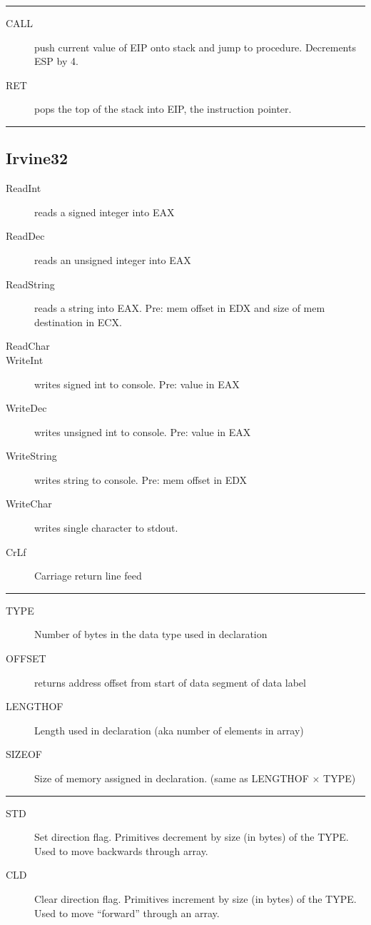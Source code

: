 \documentclass[10pt,landscape]{article}
\newcommand{\mysep}{\vspace{0.1cm}\hrule\vspace{0.1cm}}
\begin{document}
\begin{multicols*}{3}
\mysep

\begin{description}
  \item[CALL] push current value of EIP onto stack and jump to procedure.
    Decrements ESP by 4.
  \item[RET] pops the top of the stack into EIP, the instruction pointer.
\end{description}

\mysep

\subsection{Irvine32}

\begin{description}
  \item[ReadInt] reads a signed integer into EAX 
  \item[ReadDec] reads an unsigned integer into EAX
  \item[ReadString] reads a string into EAX. Pre: mem offset in EDX and size of
    mem destination in ECX.
  \item[ReadChar] 
  \item[WriteInt] writes signed int to console. Pre: value in EAX
  \item[WriteDec] writes unsigned int to console. Pre: value in EAX
  \item[WriteString] writes string to console. Pre: mem offset in EDX
  \item[WriteChar] writes single character to stdout.
  \item[CrLf] Carriage return line feed
\end{description}

\mysep

\begin{description}
  \item[TYPE] Number of bytes in the data type used in declaration
  \item[OFFSET] returns address offset from start of data segment of data label
  \item[LENGTHOF] Length used in declaration (aka number of elements in array)
  \item[SIZEOF] Size of memory assigned in declaration. (same as LENGTHOF
    $\times$ TYPE)
\end{description}

\mysep

\begin{description}
  \item[STD] Set direction flag. Primitives decrement by size (in bytes) of the 
    TYPE. Used to move backwards through array.
  \item[CLD] Clear direction flag. Primitives increment by size (in bytes) of
    the TYPE. Used to move ``forward'' through an array.
\end{description}


\end{multicols*}
\end{document}
